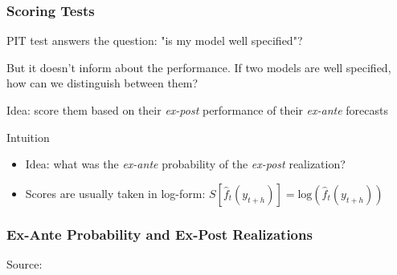 \documentclass{beamer}
\newenvironment{wideitemize}{\itemize\addtolength{\itemsep}{10pt}}{\enditemize}
\begin{document}
\begin{frame}
  \frametitle{Scoring Tests}
  \begin{wideitemize}
  \item PIT test answers the question: "is my model well specified"? 
  \item But it doesn't inform about the performance. If two models are well specified, how can we distinguish between them?
  \item Idea: score them based on their \emph{ex-post} performance of their \emph{ex-ante} forecasts
  \end{wideitemize}

  \begin{exampleblock}{Intuition}
    \begin{itemize}
    \item Idea: what was the \emph{ex-ante} probability of the \emph{ex-post} realization?
    \item Scores are usually taken in log-form: $S\left[\hat{f}_t(y_{t+h})\right] = \text{log}\left(\hat{f}_t(y_{t+h})\right)$
    \end{itemize}
  \end{exampleblock}
  
\end{frame}

\begin{frame}
  \frametitle{Ex-Ante Probability and Ex-Post Realizations }

  \hspace*{15pt}\hbox{\scriptsize Source:}        
  
\end{frame}
\end{document}
